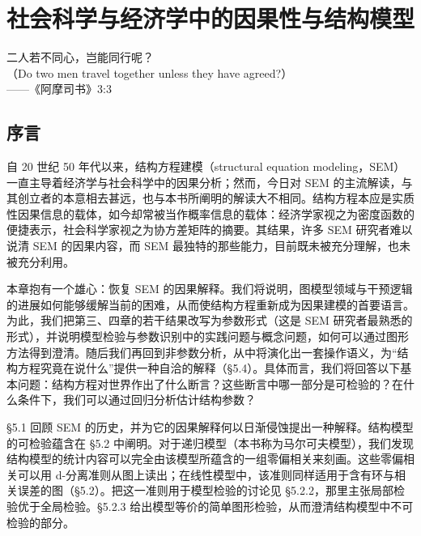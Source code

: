 \chapter{社会科学与经济学中的因果性与结构模型}

\begin{flushright}
\kaishu\small
二人若不同心，岂能同行呢？\\[2pt]
（Do two men travel together unless they have agreed?）\\[2pt]
——《阿摩司书》3:3
\end{flushright}

\section*{序言}

自 20 世纪 50 年代以来，结构方程建模（structural equation modeling，SEM）一直主导着经济学与社会科学中的因果分析；然而，今日对 SEM 的主流解读，与其创立者的本意相去甚远，也与本书所阐明的解读大不相同。结构方程本应是实质性因果信息的载体，如今却常被当作概率信息的载体：经济学家视之为密度函数的便捷表示，社会科学家视之为协方差矩阵的摘要。其结果，许多 SEM 研究者难以说清 SEM 的因果内容，而 SEM 最独特的那些能力，目前既未被充分理解，也未被充分利用。

本章抱有一个雄心：恢复 SEM 的因果解释。我们将说明，图模型领域与干预逻辑的进展如何能够缓解当前的困难，从而使结构方程重新成为因果建模的首要语言。为此，我们把第三、四章的若干结果改写为参数形式（这是 SEM 研究者最熟悉的形式），并说明模型检验与参数识别中的实践问题与概念问题，如何可以通过图形方法得到澄清。随后我们再回到非参数分析，从中将演化出一套操作语义，为“结构方程究竟在说什么”提供一种自洽的解释（\S 5.4）。具体而言，我们将回答以下基本问题：结构方程对世界作出了什么断言？这些断言中哪一部分是可检验的？在什么条件下，我们可以通过回归分析估计结构参数？

\S 5.1 回顾 SEM 的历史，并为它的因果解释何以日渐侵蚀提出一种解释。结构模型的可检验蕴含在 \S 5.2 中阐明。对于递归模型（本书称为马尔可夫模型），我们发现结构模型的统计内容可以完全由该模型所蕴含的一组零偏相关来刻画。这些零偏相关可以用 d-分离准则从图上读出；在线性模型中，该准则同样适用于含有环与相关误差的图（\S 5.2）。把这一准则用于模型检验的讨论见 \S 5.2.2，那里主张局部检验优于全局检验。\S 5.2.3 给出模型等价的简单图形检验，从而澄清结构模型中不可检验的部分。

